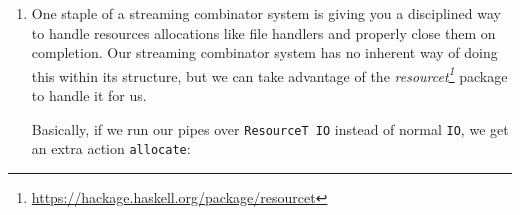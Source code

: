 \documentclass[]{article}
\newenvironment{Shaded}{}{}
\newcommand{\CommentTok}[1]{\textcolor[rgb]{0.38,0.63,0.69}{\textit{#1}}}
\newcommand{\DataTypeTok}[1]{\textcolor[rgb]{0.56,0.13,0.00}{#1}}
\newcommand{\NormalTok}[1]{#1}
\newcommand{\OtherTok}[1]{\textcolor[rgb]{0.00,0.44,0.13}{#1}}
\renewcommand{\href}[2]{#2\footnote{\url{#1}}}
\begin{document}
\begin{enumerate}
  We could then write pre-map and post-map function on \texttt{PipeF} and
  translate them to \texttt{Pipe} using \texttt{transFreeT}:

\begin{Shaded}
\begin{Highlighting}[]
\CommentTok{{-}{-} source: https://github.com/mstksg/inCode/tree/master/code{-}samples/misc/streaming{-}combinators{-}free.hs\#L140{-}L152}

\OtherTok{postMapF ::}\NormalTok{ (o }\OtherTok{{-}\textgreater{}}\NormalTok{ o\textquotesingle{}) }\OtherTok{{-}\textgreater{}} \DataTypeTok{PipeF}\NormalTok{ i o a }\OtherTok{{-}\textgreater{}} \DataTypeTok{PipeF}\NormalTok{ i o\textquotesingle{} a}

\OtherTok{preMapF ::}\NormalTok{ (i\textquotesingle{} }\OtherTok{{-}\textgreater{}}\NormalTok{ i) }\OtherTok{{-}\textgreater{}} \DataTypeTok{PipeF}\NormalTok{ i o a }\OtherTok{{-}\textgreater{}} \DataTypeTok{PipeF}\NormalTok{ i\textquotesingle{} o a}

\OtherTok{postMap ::} \DataTypeTok{Monad}\NormalTok{ m }\OtherTok{=\textgreater{}}\NormalTok{ (o }\OtherTok{{-}\textgreater{}}\NormalTok{ o\textquotesingle{}) }\OtherTok{{-}\textgreater{}} \DataTypeTok{Pipe}\NormalTok{ i o m a }\OtherTok{{-}\textgreater{}} \DataTypeTok{Pipe}\NormalTok{ i o\textquotesingle{} m a}
\NormalTok{postMap f }\OtherTok{=}\NormalTok{ transFreeT (postMapF f)}

\OtherTok{preMap ::} \DataTypeTok{Monad}\NormalTok{ m }\OtherTok{=\textgreater{}}\NormalTok{ (i\textquotesingle{} }\OtherTok{{-}\textgreater{}}\NormalTok{ i) }\OtherTok{{-}\textgreater{}} \DataTypeTok{Pipe}\NormalTok{ i o m a }\OtherTok{{-}\textgreater{}} \DataTypeTok{Pipe}\NormalTok{ i\textquotesingle{} o m a}
\NormalTok{preMap f }\OtherTok{=}\NormalTok{ transFreeT (preMapF f)}
\end{Highlighting}
\end{Shaded}
\item
  One staple of a streaming combinator system is giving you a disciplined way to
  handle resources allocations like file handlers and properly close them on
  completion. Our streaming combinator system has no inherent way of doing this
  within its structure, but we can take advantage of the
  \emph{\href{https://hackage.haskell.org/package/resourcet}{resourcet}} package
  to handle it for us.

  Basically, if we run our pipes over \texttt{ResourceT\ IO} instead of normal
  \texttt{IO}, we get an extra action \texttt{allocate}:


\end{enumerate}
\end{document}
